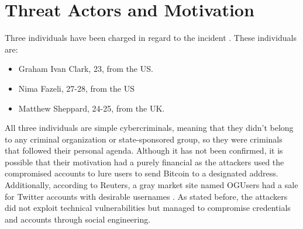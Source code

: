 \chapter{Threat Actors and Motivation}
Three individuals have been charged in regard to the incident \cite{doj, wusf}. These individuals are:
\begin{itemize}
\item Graham Ivan Clark, 23, from the US.
\item Nima Fazeli, 27-28, from the US
\item Matthew Sheppard, 24-25, from the UK.
\end{itemize}
All three individuals are simple cybercriminals, meaning that they didn't belong to any criminal organization or state-sponsored group, so they were criminals that followed their personal agenda.
\newline
Although it has not been confirmed, it is possible that their motivation had a purely financial as the attackers used the compromised accounts to lure users to send Bitcoin to a designated address. Additionally, according to Reuters, a gray market site named OGUsers had a sale for Twitter accounts with desirable usernames \cite{reuters}. 
\newline
As stated before, the attackers did not exploit technical vulnerabilities but managed to compromise credentials and accounts through social engineering.